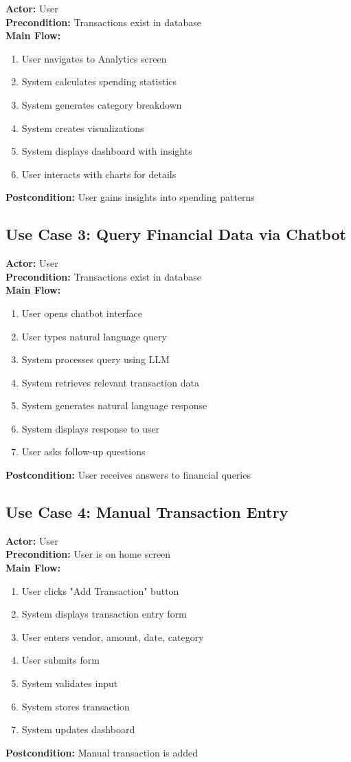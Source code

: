 \documentclass[11pt,a4paper]{report}
\begin{document}
\textbf{Actor:} User\\
\textbf{Precondition:} Transactions exist in database\\
\textbf{Main Flow:}
\begin{enumerate}
    \item User navigates to Analytics screen
    \item System calculates spending statistics
    \item System generates category breakdown
    \item System creates visualizations
    \item System displays dashboard with insights
    \item User interacts with charts for details
\end{enumerate}
\textbf{Postcondition:} User gains insights into spending patterns

\subsection{Use Case 3: Query Financial Data via Chatbot}

\textbf{Actor:} User\\
\textbf{Precondition:} Transactions exist in database\\
\textbf{Main Flow:}
\begin{enumerate}
    \item User opens chatbot interface
    \item User types natural language query
    \item System processes query using LLM
    \item System retrieves relevant transaction data
    \item System generates natural language response
    \item System displays response to user
    \item User asks follow-up questions
\end{enumerate}
\textbf{Postcondition:} User receives answers to financial queries

\subsection{Use Case 4: Manual Transaction Entry}

\textbf{Actor:} User\\
\textbf{Precondition:} User is on home screen\\
\textbf{Main Flow:}
\begin{enumerate}
    \item User clicks "Add Transaction" button
    \item System displays transaction entry form
    \item User enters vendor, amount, date, category
    \item User submits form
    \item System validates input
    \item System stores transaction
    \item System updates dashboard
\end{enumerate}
\textbf{Postcondition:} Manual transaction is added
\end{document}
